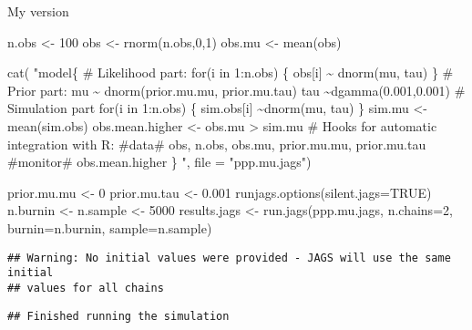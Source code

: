 \documentclass[
  ignorenonframetext,
]{beamer}
\newenvironment{Shaded}{\begin{snugshade}}{\end{snugshade}}
\newcommand{\AttributeTok}[1]{\textcolor[rgb]{0.77,0.63,0.00}{#1}}
\newcommand{\ConstantTok}[1]{\textcolor[rgb]{0.00,0.00,0.00}{#1}}
\newcommand{\DecValTok}[1]{\textcolor[rgb]{0.00,0.00,0.81}{#1}}
\newcommand{\FloatTok}[1]{\textcolor[rgb]{0.00,0.00,0.81}{#1}}
\newcommand{\FunctionTok}[1]{\textcolor[rgb]{0.00,0.00,0.00}{#1}}
\newcommand{\NormalTok}[1]{#1}
\newcommand{\OtherTok}[1]{\textcolor[rgb]{0.56,0.35,0.01}{#1}}
\newcommand{\StringTok}[1]{\textcolor[rgb]{0.31,0.60,0.02}{#1}}
\begin{document}
\begin{frame}[fragile]{My version}
\protect\hypertarget{my-version}{}
\begin{Shaded}
\begin{Highlighting}[]
\NormalTok{n.obs }\OtherTok{\textless{}{-}} \DecValTok{100}
\NormalTok{obs }\OtherTok{\textless{}{-}} \FunctionTok{rnorm}\NormalTok{(n.obs,}\DecValTok{0}\NormalTok{,}\DecValTok{1}\NormalTok{)}
\NormalTok{obs.mu }\OtherTok{\textless{}{-}} \FunctionTok{mean}\NormalTok{(obs)}

\FunctionTok{cat}\NormalTok{(}
\StringTok{"model\{}
\StringTok{  \# Likelihood part:}
\StringTok{  for(i in 1:n.obs) \{}
\StringTok{    obs[i] \textasciitilde{} dnorm(mu, tau)}
\StringTok{  \}}
\StringTok{    }
\StringTok{  \# Prior part:}
\StringTok{  mu \textasciitilde{} dnorm(prior.mu.mu, prior.mu.tau)}
\StringTok{  tau \textasciitilde{}dgamma(0.001,0.001)}
\StringTok{  }
\StringTok{  \# Simulation part}
\StringTok{  for(i in 1:n.obs) \{}
\StringTok{    sim.obs[i] \textasciitilde{}dnorm(mu, tau)}
\StringTok{  \}}
\StringTok{  sim.mu \textless{}{-} mean(sim.obs)}
\StringTok{  obs.mean.higher \textless{}{-} obs.mu \textgreater{} sim.mu}
\StringTok{  }
\StringTok{  \# Hooks for automatic integration with R:}
\StringTok{  \#data\# obs, n.obs, obs.mu, prior.mu.mu, prior.mu.tau}
\StringTok{  \#monitor\# obs.mean.higher}
\StringTok{\}}
\StringTok{"}\NormalTok{, }\AttributeTok{file =} \StringTok{"ppp.mu.jags"}\NormalTok{)}

\NormalTok{prior.mu.mu }\OtherTok{\textless{}{-}} \DecValTok{0}
\NormalTok{prior.mu.tau }\OtherTok{\textless{}{-}} \FloatTok{0.001}
\FunctionTok{runjags.options}\NormalTok{(}\AttributeTok{silent.jags=}\ConstantTok{TRUE}\NormalTok{)}
\NormalTok{n.burnin }\OtherTok{\textless{}{-}}\NormalTok{ n.sample }\OtherTok{\textless{}{-}} \DecValTok{5000}
\NormalTok{results.jags }\OtherTok{\textless{}{-}} \FunctionTok{run.jags}\NormalTok{(}\StringTok{\textquotesingle{}ppp.mu.jags\textquotesingle{}}\NormalTok{, }\AttributeTok{n.chains=}\DecValTok{2}\NormalTok{, }\AttributeTok{burnin=}\NormalTok{n.burnin, }\AttributeTok{sample=}\NormalTok{n.sample)}
\end{Highlighting}
\end{Shaded}

\begin{verbatim}
## Warning: No initial values were provided - JAGS will use the same initial
## values for all chains
\end{verbatim}

\begin{verbatim}
## Finished running the simulation
\end{verbatim}


\end{frame}
\end{document}
